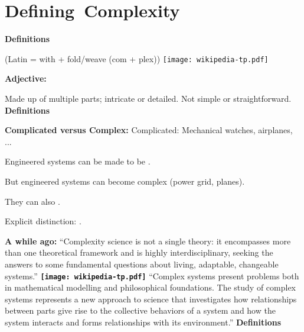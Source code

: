 

\section{Defining\ Complexity}
  \textbf{Definitions}

   (Latin = with + fold/weave (com + plex))
  \hfill
  \texttt{[image: wikipedia-tp.pdf]}

  \medskip

  \textbf{Adjective:}
    
     Made up of multiple parts; intricate or detailed.
     Not simple or straightforward.
  \textbf{Definitions}

  \textbf{Complicated versus Complex:}
      Complicated: Mechanical watches, airplanes, ...
     
      Engineered systems can be made to be .
    
      But engineered systems can become complex (power grid, planes).
     
      They can also .
     
      Explicit distinction: .

  \textbf{
      A while ago:
    }
    ``Complexity science is not a single theory: 
    it encompasses more than one theoretical framework and is highly
    interdisciplinary, seeking the answers to some fundamental questions
    about living, adaptable, changeable systems.''
  \textbf{
      \hfill \texttt{[image: wikipedia-tp.pdf]} 
    }   
    ``Complex systems present problems both in mathematical modelling
and philosophical foundations. The study of complex systems represents
a new approach to science that investigates how relationships between
parts give rise to the collective behaviors of a system and how the
system interacts and forms relationships with its environment.''
  \textbf{Definitions}

